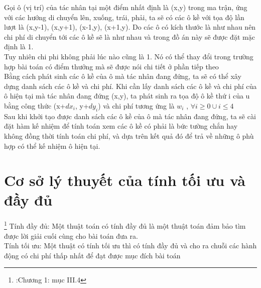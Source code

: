 \documentclass[11pt]{article} %
\begin{document}
Gọi ô (vị trí) của tác nhân tại một điểm nhất định là (x,y) trong ma trận, ứng với các hướng di chuyển lên, xuống, trái, phải, ta sẽ có các ô kề với tọa độ lần lượt là (x,y-1), (x,y+1), (x-1,y), (x+1,y). Do các ô có kích thước là như nhau nên chi phí di chuyển tới các ô kề sẽ là như nhau và trong đồ án này sẽ được đặt mặc định là 1.\\
Tuy nhiên chi phi không phải lúc nào cũng là 1. Nó có thể thay đổi trong trường hợp bài toán có điểm thưởng mà sẽ được nói chi tiết ở phần tiếp theo\\
Bằng cách phát sinh các ô kề của ô mà tác nhân đang đứng, ta sẽ có thể xây dựng danh sách các ô kề và chi phí. Khi cần lấy danh sách các ô kề và chi phí của ô hiện tại mà tác nhân đang đứng (x,y), ta phát sinh ra tọa độ ô kề thứ i của u bằng công thức (x+$dx_{i}$, y+$dy_{i}$) và chi phí tương ứng là $w_{i}$ , $\forall{i\ge0}\cup{i\le4}$\\

Sau khi khởi tạo được danh sách các ô kề của ô mà tác nhân đang đứng, ta sẽ cài đặt hàm kế nhiệm để tính toán xem các ô kề có phải là bức tường chắn hay không đồng thời tính toán chi phí, và dựa trên kết quả đó để trả về những ô phù hợp có thể kế nhiệm ô hiện tại.
\section{Cơ sở lý thuyết của tính tối ưu và đầy đủ}
\footnote{\cite{csttnt_lhb}:Chương 1: mục III.4} 
Tính đầy đủ: Một thuật toán có tính đầy đủ là một thuật toán đảm bảo tìm được lời giải cuối cùng cho bài toán đưa ra.\\
Tính tối ưu: Một thuật có tính tối ưu thì có tính đầy đủ và cho ra chuỗi các hành động có chi phí thấp nhất để đạt được mục đích bài toán\\
\end{document}
